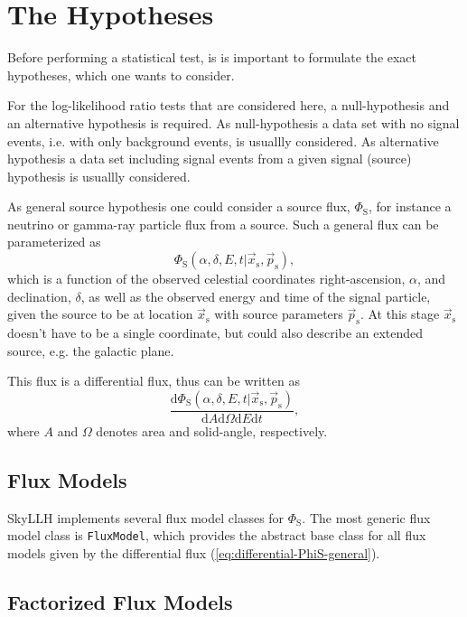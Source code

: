 \documentclass{article}
\newcommand{\code}[1]{\texttt{#1}}
\newcommand{\class}[1]{\colorbox{blue!30}{\code{#1}}}
\newcommand{\ps}{\vec{p}_{\mathrm{s}}}
\newcommand{\xs}{\vec{x}_{\mathrm{s}}}
\begin{document}
\section{The Hypotheses}

Before performing a statistical test, is is important to formulate the exact
hypotheses, which one wants to consider.

For the log-likelihood ratio tests that are considered here, a null-hypothesis
and an alternative hypothesis is required. As null-hypothesis a data set with
no signal events, i.e. with only background events, is usuallly considered.
As alternative hypothesis a data set including signal events from a given signal
(source) hypothesis is usuallly considered.

As general source hypothesis one could consider a source flux, $\Phi_{\mathrm{S}}$,
for instance a neutrino or gamma-ray particle flux from a source. Such a general flux
can be parameterized as
\begin{equation}
 \Phi_{\mathrm{S}}(\alpha,\delta,E,t|\xs, \ps),
 \label{eq:PhiS-general}
\end{equation}
which is a function of the observed celestial coordinates right-ascension, $\alpha$, and
declination, $\delta$, as well as the observed energy and time of the signal
particle, given the source to be at location $\xs$ with source
parameters $\ps$. At this stage $\xs$ doesn't have to be a single coordinate,
but could also describe an extended source, e.g. the galactic plane.

This flux is a differential flux, thus can be written as
\begin{equation}
 \frac{\mathrm{d}\Phi_{\mathrm{S}}(\alpha,\delta,E,t|\xs, \ps)}{\mathrm{d}A\mathrm{d}\Omega\mathrm{d}E\mathrm{d}t},
 \label{eq:differential-PhiS-general}
\end{equation}
where $A$ and $\Omega$ denotes area and solid-angle, respectively.

\subsection{Flux Models}
\label{sec:flux-models}

SkyLLH implements several flux model classes for $\Phi_{\mathrm{S}}$. The most
generic flux model class is \class{FluxModel}, which provides the abstract base
class for all flux models given by the differential flux
(\ref{eq:differential-PhiS-general}).

\subsection{Factorized Flux Models}
\label{sec:factorized-flux-models}
\end{document}
